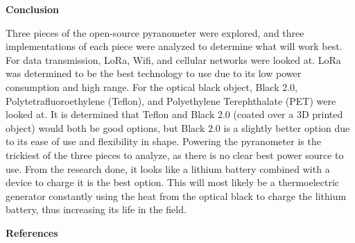 \documentclass[10pt,draftclsnofoot,onecolumn,letterpaper]{article}
\begin{document}
    {\fontsize{12pt}{12.0pt} \textbf{Conclusion}\\\selectfont 
    \par}\par
    {\fontsize{12pt}{12.0pt} Three pieces of the open-source pyranometer were explored, and three implementations of each piece were analyzed to determine what will work best. For data transmission, LoRa, Wifi, and cellular networks were looked at. LoRa was determined to be the best technology to use due to its low power consumption and high range. For the optical black object, Black 2.0, Polytetrafluoroethylene (Teflon), and Polyethylene Terephthalate (PET) were looked at. It is determined that Teflon and Black 2.0 (coated over a 3D printed object) would both be good options, but Black 2.0 is a slightly better option due to its ease of use and flexibility in shape. Powering the pyranometer is the trickiest of the three pieces to analyze, as there is no clear best power source to use. From the research done, it looks like a lithium battery combined with a device to charge it is the best option. This will most likely be a thermoelectric generator constantly using the heat from the optical black to charge the lithium battery, thus increasing its life in the field.\\\selectfont 
    \par}\par
    
    \newpage
    
    {\fontsize{12pt}{12.0pt} \textbf{References}\\\selectfont 
    \par}\par
    
\end{document}
